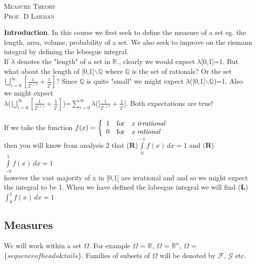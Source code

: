 \documentclass[12pt]{article}
\def\QQ{\mathbb{Q}}
\def\RR{\mathbb{R}}
\def\head#1{\medskip \noindent \textbf{#1}.}
\begin{document}
\begin{titlepage}
\begin{center}
\textsc{\LARGE Measure Theory }\\[1.5cm]

\textsc{\Large Prof. D Larman}\\[0.5cm]
\end{center}
\end{titlepage}

\head{Introduction}  In this course we first seek to define the measure of a set eg. the length, area, volume, probability of a set. We also seek to improve on the riemann integral by defining the lebesgue integral.\\
 If $\lambda$ denotes the "length" of a set in  $\RR$., clearly we would expect $\lambda$[0,1]=1. But what about the length of [0,1]$\backslash\QQ$ where $\QQ$ is the set of rationals? Or the set $\bigcup_{i=0}^{\infty}[\frac{1}{2^{i+1}} +\frac{1}{2^i} ]$? Since $\QQ$ is quite "small" we might expect $\lambda$([0,1]$\backslash\QQ$)=1. Also we might expect\\  $\lambda$($\bigcup_{i=0}^{\infty}[\frac{1}{2^{i+1}} +\frac{1}{2^i} ]$)=$\sum_{i=0}^{\infty}\lambda$([$\frac{1}{2^{i+1}} +\frac{1}{2^i} ]$.  Both expectations are true!\\\\
If we take the function  $f(x) = \left\{ \begin{array}{rcl}
1 & \mbox{for} &
 \mbox{\emph{x  irrational}} \\ 0 & \mbox{for} & \mbox{\emph{x rational}} \\
\end{array}\right.$ \\then you will know from analysis 2 that ($\mathbf{R}$)$\int\limits_{0}^{-1}f(x)\,dx =1$ and ($\mathbf{R}$)$\int\limits_{-0}^{1}f(x)\,dx =1$
\\ however the vast majority of x in [0,1] are irrational and and so we might expect the integral to be 1. When we have defined the labesgue integral we will find ($\mathbf{L}$)$\int_{0}^{1}f(x)\,dx =1$

\begin{center}
\section{Measures}
\end{center}

We will work within a set $\Omega$. For example  $\Omega$ = $\RR$, $\Omega$ = $\RR^n$, $\Omega$ =$ \{sequence of heads \& tails\}$. Families of subsets of $\Omega$ will be denoted by $\mathcal{F}$,  $\mathcal{G}$ etc.\\
\end{document}
